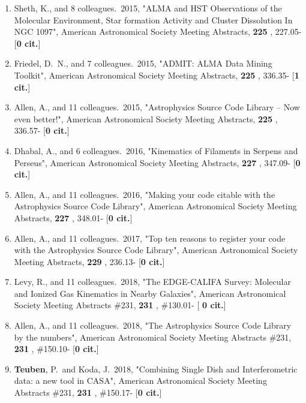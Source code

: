 \documentclass[11pt,letterpaper]{article}
\begin{document}
\begin{enumerate}[resume,label=\textbf{\arabic*}.]
\item  
Sheth, K., and 8 colleagues.\  2015,  "ALMA and HST Observations of the 
Molecular Environment, Star formation Activity and Cluster Dissolution In 
NGC 1097", American Astronomical Society Meeting Abstracts,  {\bf 225} , 
227.05- [{\bf 0 cit.}] 

\item  
Friedel, D.~N., and 7 colleagues.\  2015,  "ADMIT: ALMA Data Mining 
Toolkit", American Astronomical Society Meeting Abstracts,  {\bf 225} , 
336.35- [{\bf 1 cit.}] 

\item  
Allen, A., and 11 colleagues.\  2015,  "Astrophysics Source Code Library -- 
Now even better!", American Astronomical Society Meeting Abstracts,  {\bf 
225} , 336.57- [{\bf 0 cit.}] 
\item  
Dhabal, A., and 6 colleagues.\  2016,  "Kinematics of Filaments in Serpens 
and Perseus", American Astronomical Society Meeting Abstracts,  {\bf 227} , 
347.09- [{\bf 0 cit.}] 

\item  
Allen, A., and 11 colleagues.\  2016,  "Making your code citable with the 
Astrophysics Source Code Library", American Astronomical Society Meeting 
Abstracts,  {\bf 227} , 348.01- [{\bf 0 cit.}] 
\item  
Allen, A., and 11 colleagues.\  2017,  "Top ten reasons to register your 
code with the Astrophysics Source Code Library", American Astronomical 
Society Meeting Abstracts,  {\bf 229} , 236.13- [{\bf 0 cit.}] 
\item  
Levy, R., and 11 colleagues.\  2018,  "The EDGE-CALIFA Survey: 
Molecular and Ionized Gas Kinematics in Nearby Galaxies", American 
Astronomical Society Meeting Abstracts \#231,  {\bf 231} , \#130.01- [{\bf 
0 cit.}] 

\item  
Allen, A., and 11 colleagues.\  2018,  "The Astrophysics Source Code 
Library by the numbers", American Astronomical Society Meeting Abstracts 
\#231,  {\bf 231} , \#150.10- [{\bf 0 cit.}] 
\item  
{\bf Teuben}, P.~and Koda, J.\  2018,  "Combining Single Dish and 
Interferometric data: a new tool in CASA", American Astronomical Society 
Meeting Abstracts \#231,  {\bf 231} , \#150.17- [{\bf 0 cit.}] 


\end{enumerate}
\end{document}

